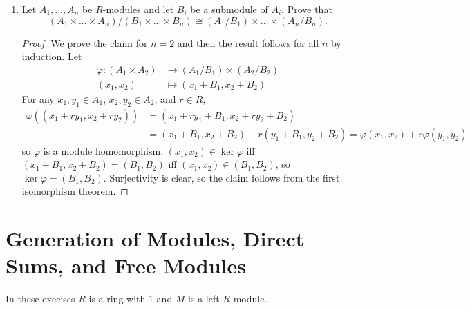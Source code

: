 \documentclass{report}
\begin{document}
\begin{enumerate}
	\item Let $A_1,...,A_n$ be $R$-modules and let $B_i$ be a submodule of $A_i$. Prove that
		$$(A_1\times...\times A_n) / (B_1\times ... \times B_n)\cong (A_1 / B_1)\times ... \times (A_n / B_n).$$
		\begin{proof}
			We prove the claim for $n=2$ and then the result follows for all $n$ by induction. Let 
			\begin{align*}
				\varphi:(A_1\times A_2) &\to (A_1 / B_1)\times (A_2 / B_2)\\
				(x_1, x_2) &\mapsto (x_1 + B_1, x_2 + B_2)
			\end{align*}
			For any $x_1,y_1\in A_1$, $x_2,y_2\in A_2$, and $r\in R$, 
			\begin{align*}
				\varphi((x_1+ry_1,x_2+ry_2))&=(x_1+ry_1+B_1,x_2+ry_2+B_2)\\
				&=(x_1+B_1,x_2+B_2) + r(y_1+B_1,y_2+B_2) = \varphi(x_1,x_2)+r\varphi(y_1,y_2)
			\end{align*}
			so $\varphi$ is a module homomorphism. $(x_1,x_2)\in\ker\varphi$ iff $(x_1+B_1,x_2+B_2)=(B_1,B_2)$ iff $(x_1,x_2)\in(B_1,B_2)$, so $\ker\varphi=(B_1,B_2)$.
			Surjectivity is clear, so the claim follows from the first isomorphism theorem.
		\end{proof}
\end{enumerate}

\section{Generation of Modules, Direct Sums, and Free Modules}
In these execises $R$ is a ring with $1$ and $M$ is a left $R$-module.
\end{document}
